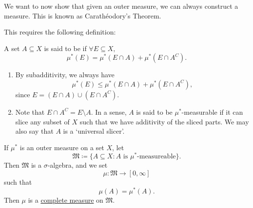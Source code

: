 \documentclass[notoc,notitlepage]{tufte-book}
\begin{document}
We want to now show that given an outer measure,
we can always construct a measure.
This is known as Carathéodory's Theorem.

This requires the following definition:

\begin{defn}[$\mu^*$-measurability]\label{defn:_mu_measurability}
  A set $A \subseteq X$ is said to be 
  if $\forall E \subseteq X$,
  \begin{equation*}
    \mu^*(E) = \mu^*(E \cap A) + \mu^*(E \cap A^C).
  \end{equation*}
\end{defn}

\begin{remark}
  \begin{enumerate}
    \item By subadditivity, we always have
      \begin{equation*}
        \mu^*(E) \leq \mu^*(E \cap A) + \mu^*(E \cap A^C),
      \end{equation*}
      since $E = (E \cap A) \cup (E \cap A^C)$.
    \item Note that $E \cap A^C = E \setminus A$.
      In a sense, $A$ is said to be $\mu^*$-measurable
      if it can slice any subset of $X$ such that we have
      additivity of the sliced parts.
      We may also say that $A$ is a `universal slicer'.
  \end{enumerate}
\end{remark}

\begin{thm}\label{thm:caratheodory_s_theorem}
  If $\mu^*$ is an outer measure on a set $X$, let
  \begin{equation*}
    \mathfrak{M} \coloneqq \{ A \subseteq X
      : A \text{ is } \mu^*\text{-measureable} \}.
  \end{equation*}
  Then $\mathfrak{M}$ is a $\sigma$-algebra, and we set
  \begin{equation*}
    \mu : \mathfrak{M} \to [0, \infty]
  \end{equation*}
  such that
  \begin{equation*}
    \mu(A) = \mu^*(A).
  \end{equation*}
  Then $\mu$ is a \hyperref[defn:complete_measure_space]{complete measure}
  on $\mathfrak{M}$.
\end{thm}

\end{document}
